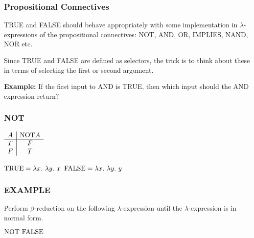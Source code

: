 \documentclass{beamer}
\begin{document}
\begin{frame}
	\frametitle{Propositional Connectives}

	TRUE and FALSE should behave appropriately with some implementation in $\lambda$-expressions of the propositional connectives: NOT, AND, OR, IMPLIES, NAND, NOR etc.

	Since TRUE and FALSE are defined as selectors, the trick is to think about these in terms of selecting the first or second argument. 
	
	\vspace{0.3cm}

	{\bf Example:} If the first input to AND is TRUE, then which input should the AND expression return? 

	\vspace{2cm}

\end{frame}

\begin{frame}
	\frametitle{NOT}

	\begin{center}
		$\begin{array}{ l | c }			
			A &  \text{NOT} A\\
			\cline{1 - 2}
			T &  F \\ 
			F &  T
		\end{array}$
	\end{center}

	$\TRUE = \lambda x. \ \lambda y. \ x$ \hspace{4cm} $\FALSE = \lambda x. \ \lambda y. \ y$

	\vspace{5cm}

\end{frame}

\begin{frame}
	\frametitle{EXAMPLE}

	Perform $\beta$-reduction on the following $\lambda$-expression until the $\lambda$-expression is in normal form.
	
	\vspace{0.5cm}

	$\text{NOT} \ \text{FALSE}$

	\vspace{5cm}

\end{frame}
\end{document}
